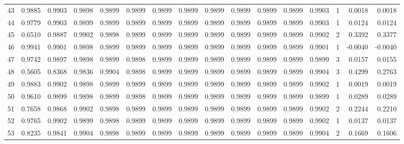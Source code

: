 \begin{tabular}{lrrrrrrrrrrrrrrr}
43  &      0.9885 &  0.9903 &  0.9898 &  0.9899 &  0.9899 &  0.9899 &  0.9899 &  0.9899 &  0.9899 &  0.9899 &   0.9899 &     0.9903 &      1 &                    0.0018 &                     0.0018 \\
44  &      0.9779 &  0.9903 &  0.9899 &  0.9899 &  0.9899 &  0.9899 &  0.9899 &  0.9899 &  0.9899 &  0.9899 &   0.9899 &     0.9903 &      1 &                    0.0124 &                     0.0124 \\
45  &      0.6510 &  0.9887 &  0.9902 &  0.9898 &  0.9899 &  0.9899 &  0.9899 &  0.9899 &  0.9899 &  0.9899 &   0.9899 &     0.9902 &      2 &                    0.3392 &                     0.3377 \\
46  &      0.9941 &  0.9901 &  0.9898 &  0.9899 &  0.9899 &  0.9899 &  0.9899 &  0.9899 &  0.9899 &  0.9899 &   0.9899 &     0.9901 &      1 &                   -0.0040 &                    -0.0040 \\
47  &      0.9742 &  0.9897 &  0.9898 &  0.9899 &  0.9898 &  0.9899 &  0.9899 &  0.9899 &  0.9899 &  0.9899 &   0.9899 &     0.9899 &      3 &                    0.0157 &                     0.0155 \\
48  &      0.5605 &  0.8368 &  0.9836 &  0.9904 &  0.9898 &  0.9899 &  0.9899 &  0.9899 &  0.9899 &  0.9899 &   0.9899 &     0.9904 &      3 &                    0.4299 &                     0.2763 \\
49  &      0.9883 &  0.9902 &  0.9898 &  0.9899 &  0.9899 &  0.9899 &  0.9899 &  0.9899 &  0.9899 &  0.9899 &   0.9899 &     0.9902 &      1 &                    0.0019 &                     0.0019 \\
50  &      0.9610 &  0.9899 &  0.9898 &  0.9899 &  0.9898 &  0.9899 &  0.9899 &  0.9899 &  0.9899 &  0.9899 &   0.9899 &     0.9899 &      1 &                    0.0289 &                     0.0289 \\
51  &      0.7658 &  0.9868 &  0.9902 &  0.9898 &  0.9899 &  0.9899 &  0.9899 &  0.9899 &  0.9899 &  0.9899 &   0.9899 &     0.9902 &      2 &                    0.2244 &                     0.2210 \\
52  &      0.9765 &  0.9902 &  0.9899 &  0.9898 &  0.9899 &  0.9899 &  0.9899 &  0.9899 &  0.9899 &  0.9899 &   0.9899 &     0.9902 &      1 &                    0.0137 &                     0.0137 \\
53  &      0.8235 &  0.9841 &  0.9904 &  0.9898 &  0.9899 &  0.9899 &  0.9899 &  0.9899 &  0.9899 &  0.9899 &   0.9899 &     0.9904 &      2 &                    0.1669 &                     0.1606 \\

\end{tabular}
